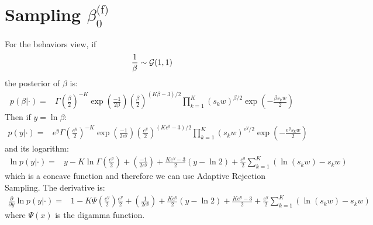 \documentclass[smallextended]{svjour3}          %
\newcommand\alberto[1]{\textcolor{black}{#1}}
\newcommand{\betaof}{\beta_{0}^\text{(f)}}
\begin{document}
\section{Sampling $\betaof$}
For the behaviors view, if 
\begin{align*}
	\frac{1}{\beta} \sim \alberto{\mathcal{G}}(1,1)
\end{align*}
the posterior of $\beta$ is:
\begin{align*}
	p(\beta | \cdot) 
	=&  
	\Gamma(\frac{\beta}{2})^{-K}\exp\left(\frac{-1}{2\beta}\right) \left(\frac{\beta}{2}\right)
	^{(K \beta -3)/2}
	\prod_{k=1}^{K} (s_k w)^{\beta/2} \exp\left(-\frac{\beta s_k w}{2}\right)
\end{align*}
Then if $y=\ln\beta$:
\begin{align*}
	p(y | \cdot) =&  e^y \Gamma(\frac{e^y}{2})^{-K}\exp\left(\frac{-1}{2e^y}\right) \left(\frac{e^y}{2}\right)
	^{(K e^y -3)/2}
	\prod_{k=1}^{K} (s_k w)^{e^y/2} \exp\left(-\frac{e^y s_k w}{2}\right)
\end{align*}
and its logarithm:
\begin{align*}
	\ln p(y | \cdot) =& y -K\ln\Gamma \left(\frac{e^y}{2}\right) + \left(\frac{-1}{2e^y}\right)%
	+\frac{Ke^y-3}{2}\left(y - \ln2\right)%
	+ \frac{e^y}{2}\sum_{k=1}^{K} \left(\ln (s_k w) - s_k w \right)
\end{align*}
which is a concave function and therefore we can use Adaptive Rejection Sampling. The derivative is:
\begin{align*}
	\frac{\partial}{\partial y} \ln p(y | \cdot) =& 
	1 
	-K \Psi \left(\frac{e^y}{2}\right) \frac{e^y}{2}
	+ \left(\frac{1}{2e^y}\right)
	+\frac{Ke^y}{2} \left(y - \ln2\right) + \frac{Ke^y-3}{2}
	+ \frac{e^y}{2}\sum_{k=1}^{K}\left(\ln (s_k w) - s_k w\right)
\end{align*}
where $\Psi(x)$ is the digamma function.

\end{document}

